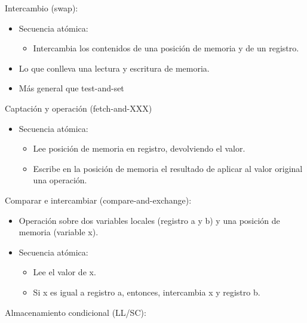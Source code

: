 \documentclass[12pt, twoside, openright]{report} %
\begin{document}
    Intercambio (swap):

    \begin{itemize}
    
    \item
      Secuencia atómica:

      \begin{itemize}
      
      \item
        Intercambia los contenidos de una posición de memoria y de un
        registro.
      \end{itemize}
    \item
      Lo que conlleva una lectura y escritura de memoria.
    \item
      Más general que test-and-set
    \end{itemize}

    Captación y operación (fetch-and-XXX)

    \begin{itemize}
    
    \item
      Secuencia atómica:

      \begin{itemize}
      
      \item
        Lee posición de memoria en registro, devolviendo el valor.
      \item
        Escribe en la posición de memoria el resultado de aplicar al
        valor original una operación.
      \end{itemize}
    \end{itemize}

    Comparar e intercambiar (compare-and-exchange):

    \begin{itemize}
    
    \item
      Operación sobre dos variables locales (registro a y b) y una
      posición de memoria (variable x).
    \item
      Secuencia atómica:

      \begin{itemize}
      
      \item
        Lee el valor de x.
      \item
        Si x es igual a registro a, entonces, intercambia x y registro
        b.
      \end{itemize}
    \end{itemize}
\pagebreak
    Almacenamiento condicional (LL/SC):
\end{document}
